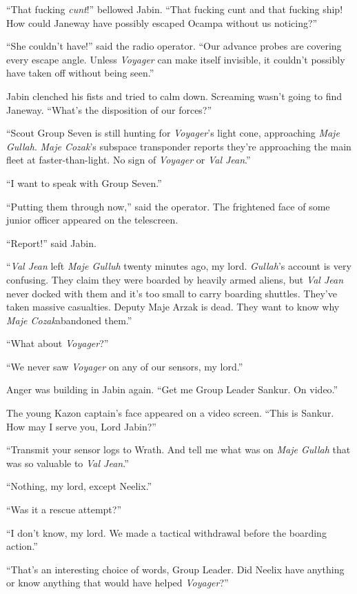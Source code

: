 \documentclass[twoside,letterpaper,12pt]{memoir}
\begin{document}
``That fucking \textit{cunt}!'' bellowed Jabin. ``That fucking cunt and that fucking ship! How could Janeway have possibly escaped Ocampa without us noticing?''

``She couldn't have!'' said the radio operator. ``Our advance probes are covering every escape angle. Unless \textit{Voyager} can make itself invisible, it couldn't possibly have taken off without being seen.''

Jabin clenched his fists and tried to calm down. Screaming wasn't going to find Janeway. ``What's the disposition of our forces?''

``Scout Group Seven is still hunting for \textit{Voyager}'s light cone, approaching \textit{Maje Gullah}. \textit{Maje Cozak}'s subspace transponder reports they're approaching the main fleet at faster-than-light. No sign of \textit{Voyager} or \textit{Val Jean}.''

``I want to speak with Group Seven.''

``Putting them through now,'' said the operator. The frightened face of some junior officer appeared on the telescreen.

``Report!'' said Jabin.

``\textit{Val Jean} left \textit{Maje Gulluh} twenty minutes ago, my lord. \textit{Gullah}'s account is very confusing. They claim they were boarded by heavily armed aliens, but \textit{Val Jean} never docked with them and it's too small to carry boarding shuttles. They've taken massive casualties. Deputy Maje Arzak is dead. They want to know why \textit{Maje Cozak}abandoned them.''

``What about \textit{Voyager}?''

``We never saw \textit{Voyager} on any of our sensors, my lord.''

Anger was building in Jabin again. ``Get me Group Leader Sankur. On video.''

The young Kazon captain's face appeared on a video screen. ``This is Sankur. How may I serve you, Lord Jabin?''

``Transmit your sensor logs to Wrath. And tell me what was on \textit{Maje Gullah} that was so valuable to \textit{Val Jean}.''

``Nothing, my lord, except Neelix.''

``Was it a rescue attempt?''

``I don't know, my lord. We made a tactical withdrawal before the boarding action.''

``That's an interesting choice of words, Group Leader. Did Neelix have anything or know anything that would have helped \textit{Voyager}?''
\end{document}
